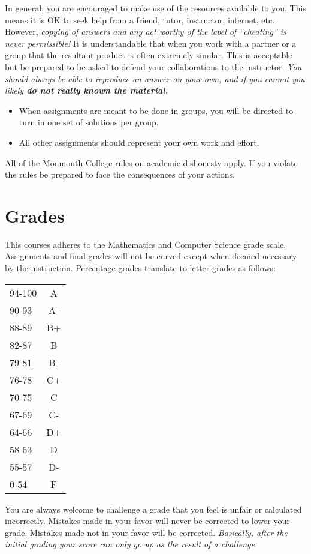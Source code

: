 \documentclass[10pt]{article}
\begin{document}
In general, you are encouraged to make use of the resources available to you.  This means it is OK to seek help from a friend, tutor, instructor, internet, etc.  However, \textit{copying of answers and any act worthy of the label of ``cheating'' is never permissible!}  It is understandable that when you work with a partner or a group that the resultant product is often extremely similar.  This is acceptable but be prepared to be asked to defend your collaborations to the instructor.  \textit{You should always be able to reproduce an answer on your own, and if you cannot you likely \textbf{do not really known the material.}} 
\begin{itemize}
\item When assignments are meant to be done in groups, you will be directed to turn in one set of solutions per group.
\item All other assignments should represent your own work and effort.
\end{itemize}
All of the Monmouth College rules on academic dishonesty apply.  If you violate the rules be prepared to face the consequences of your actions.  

\section{Grades}

This courses adheres to the Mathematics and Computer Science grade scale.  Assignments and final grades will not be curved except when deemed necessary by the instruction.  Percentage grades translate to letter grades as follows:
\newline
\begin{small}
\begin{tabular}{lc}
94-100 & A \\
90-93 & A- \\
88-89 & B+ \\
82-87 & B \\
79-81 & B- \\
76-78 & C+ \\
70-75 & C \\
67-69 & C- \\
64-66 & D+ \\
58-63 & D \\
55-57 & D- \\
0-54 & F 
\end{tabular}
\end{small}
\newline
You are always welcome to challenge a grade that you feel is unfair or calculated incorrectly.  Mistakes made in your favor will never be corrected to lower your grade.  Mistakes made not in your favor will be corrected.  \textit{Basically, after the initial grading your score can only go up as the result of a challenge.}
\end{document}
